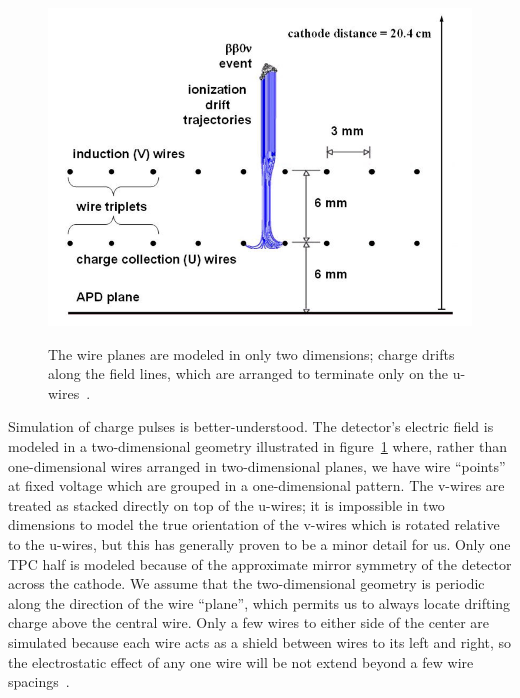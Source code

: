 \begin{figure}
\begin{center}
\includegraphics[keepaspectratio=true,width=\textwidth]{ChargeDrift2DModel.png}
\end{center}
\renewcommand{\baselinestretch}{1}
\small\normalsize
\begin{quote}
\caption{The wire planes are modeled in only two dimensions; charge drifts along the field lines, which are arranged to terminate only on the u-wires~\cite{MCDocumentRun2a}.}
\label{fig:TwoDimensionalWireModel}
\end{quote}
\end{figure}
\renewcommand{\baselinestretch}{2}
\small\normalsize

Simulation of charge pulses is better-understood.  The detector's electric field is modeled in a two-dimensional geometry illustrated in figure~\ref{fig:TwoDimensionalWireModel} where, rather than one-dimensional wires arranged in two-dimensional planes, we have wire ``points'' at fixed voltage which are grouped in a one-dimensional pattern.  The v-wires are treated as stacked directly on top of the u-wires; it is impossible in two dimensions to model the true orientation of the v-wires which is rotated relative to the u-wires, but this has generally proven to be a minor detail for us.  Only one TPC half is modeled because of the approximate mirror symmetry of the detector across the cathode.  We assume that the two-dimensional geometry is periodic along the direction of the wire ``plane'', which permits us to always locate drifting charge above the central wire.  Only a few wires to either side of the center are simulated because each wire acts as a shield between wires to its left and right, so the electrostatic effect of any one wire will be not extend beyond a few wire spacings~\cite{MCDocumentRun2a}.

